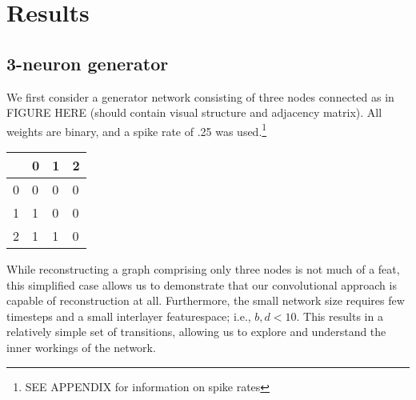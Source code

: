 
\chapter{Results}
\label{results}
\section{3-neuron generator}
\label{results_3neur}
We first consider a generator network consisting of three nodes connected as in 
FIGURE HERE (should contain visual structure and adjacency matrix). All weights 
are binary, and a spike rate of .25 was used.\footnote{SEE APPENDIX	for 
information on spike rates}

\begin{table}[h]
	\centering
	\hspace{2em}
	\begin{tabular}{l|lll}
		  & 0 & 1 & 2\\
		\hline
		0 & 0 & 0 & 0\\
		1 & 1 & 0 & 0\\
		2 & 1 & 1 & 0
	\end{tabular}
	\label{fig:2simplex+adjacency}
\end{table}

While reconstructing a graph comprising only three nodes is not much of a feat, 
this simplified case allows us to demonstrate that our convolutional approach is 
capable of reconstruction at all. Furthermore, the small network size requires 
few timesteps and a small interlayer featurespace; i.e., $b,d<10$. This results 
in a relatively simple set of transitions, allowing us to explore and understand 
the inner workings of the network.


